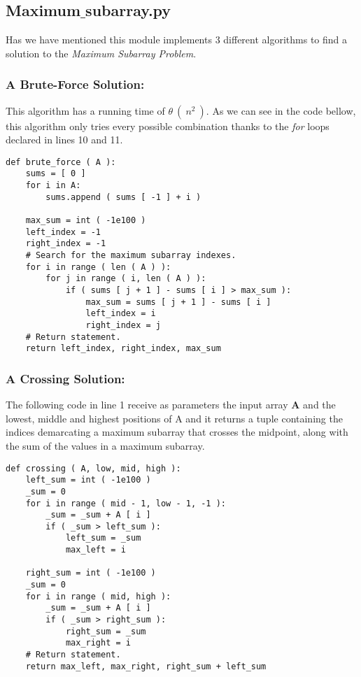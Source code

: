 \subsection{Maximum$\_$subarray.py}

Has we have mentioned this module implements 3 different algorithms to find a solution to the {\itshape Maximum Subarray Problem}.

\subsubsection{A Brute-Force Solution:}

This algorithm has a running time of $\theta\ (\ n^{2}\ )$. As we can see in the code bellow, this algorithm only tries every possible combination thanks to the {\itshape for} loops declared in lines 10 and 11. \hfill \break

\begin{lstlisting}
def brute_force ( A ):
    sums = [ 0 ]
    for i in A:
        sums.append ( sums [ -1 ] + i )
        
    max_sum = int ( -1e100 )
    left_index = -1
    right_index = -1
    # Search for the maximum subarray indexes.
    for i in range ( len ( A ) ):
        for j in range ( i, len ( A ) ):
            if ( sums [ j + 1 ] - sums [ i ] > max_sum ):
                max_sum = sums [ j + 1 ] - sums [ i ]
                left_index = i
                right_index = j
    # Return statement.
    return left_index, right_index, max_sum
\end{lstlisting}

\subsubsection{A Crossing Solution:}

The following code in line 1 receive as parameters the input array {\bfseries A} and the lowest, middle and highest positions of A and it returns a tuple containing the indices demarcating a maximum subarray that crosses the midpoint, along with the sum of the values in a maximum subarray. \hfill \break

\begin{lstlisting}
def crossing ( A, low, mid, high ):
    left_sum = int ( -1e100 )
    _sum = 0
    for i in range ( mid - 1, low - 1, -1 ):
        _sum = _sum + A [ i ]
        if ( _sum > left_sum ):
            left_sum = _sum
            max_left = i

    right_sum = int ( -1e100 )
    _sum = 0
    for i in range ( mid, high ):
        _sum = _sum + A [ i ]
        if ( _sum > right_sum ):
            right_sum = _sum
            max_right = i
    # Return statement.
    return max_left, max_right, right_sum + left_sum

\end{lstlisting} \hfill

